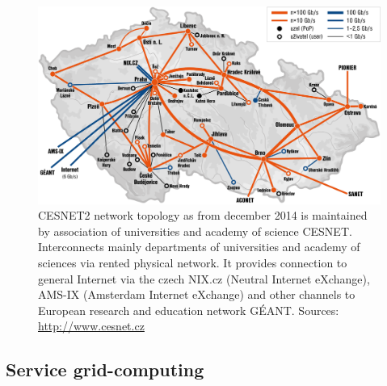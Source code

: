 \begin{figure}[ht]
    \centering
    \includegraphics[width=1\textwidth]{chapter2/cesnet2-topo1.png}
    \caption{CESNET2 network topology as from december 2014 is maintained by association of universities and academy of science CESNET. Interconnects mainly departments of universities and academy of sciences via rented physical network. It provides connection to general Internet via the czech NIX.cz (Neutral Internet eXchange), AMS-IX (Amsterdam Internet eXchange) and other channels to European research and education network GÉANT. Sources: \url{http://www.cesnet.cz}}
    \label{fig:cesnet}
\end{figure}

\subsection{Service grid-computing}
\label{sec:servicegrid}

